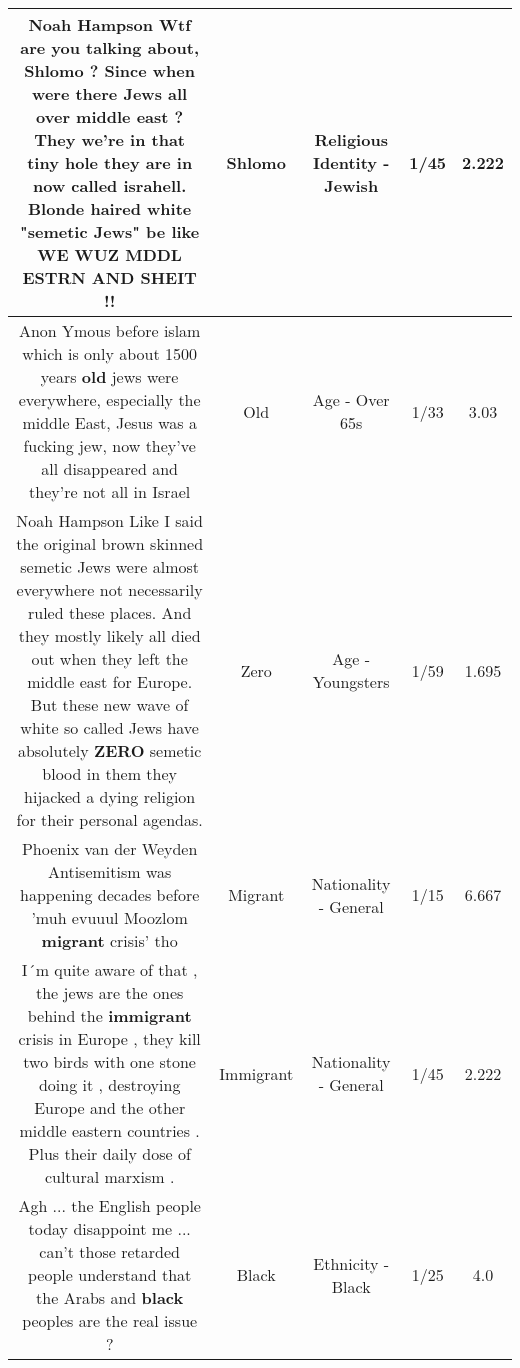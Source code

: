 \documentclass[11pt]{article}
\newlength\mylength
\begin{document}
\begin{center}
\begin{longtable}{|C{.65\mylength}|C{.30\mylength}|C{.12\mylength}|C{.12\mylength}|C{.12\mylength}|}
  \small Noah Hampson Wtf are you talking about, \textbf{Shlomo} ? Since when were there Jews all over middle east ? They we're in that tiny hole they are in now called israhell. Blonde haired white "semetic Jews" be like WE WUZ MDDL ESTRN AND SHEIT !!\normalsize   & Shlomo & Religious Identity - Jewish & 1/45 & 2.222 \\  \hline
  \small Anon Ymous before islam which is only about 1500 years \textbf{old} jews were everywhere, especially the middle East, Jesus was a fucking jew, now they've all disappeared and they're not all in Israel\normalsize   & Old & Age - Over 65s & 1/33 & 3.03 \\  \hline
  \small Noah Hampson Like I said the original brown skinned semetic Jews were almost everywhere not necessarily ruled these places. And they mostly likely all died out when they left the middle east for Europe. But these new wave of white so called Jews have absolutely \textbf{ZERO} semetic blood in them they hijacked a dying religion for their personal agendas.\normalsize   & Zero & Age - Youngsters & 1/59 & 1.695 \\  \hline
  \small Phoenix van der Weyden Antisemitism was happening decades before 'muh evuuul Moozlom \textbf{migrant} crisis' tho\normalsize   & Migrant & Nationality - General & 1/15 & 6.667 \\  \hline
  \small I´m quite aware of that , the jews are the ones behind the \textbf{immigrant} crisis in Europe , they kill two birds with one stone doing it , destroying Europe and the other middle eastern countries . Plus their daily dose of cultural marxism .\normalsize   & Immigrant & Nationality - General & 1/45 & 2.222 \\  \hline
  \small Agh ... the English people today disappoint me ... can't those retarded people understand that the Arabs and \textbf{black} peoples are the real issue ?\normalsize   & Black & Ethnicity - Black & 1/25 & 4.0 \\  \hline

\end{longtable}
\end{center}
\end{document}
